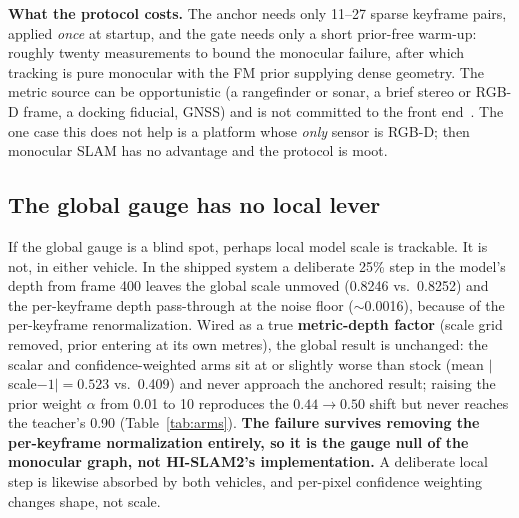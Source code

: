 \noindent\textbf{What the protocol costs.} The anchor needs only 11--27 sparse
keyframe pairs, applied \emph{once} at startup, and the gate needs only a short
prior-free warm-up: roughly twenty measurements to bound the monocular failure,
after which tracking is pure monocular with the FM prior supplying dense
geometry. The metric source can be opportunistic (a rangefinder or sonar, a
brief stereo or RGB-D frame, a docking fiducial, GNSS) and is not committed to
the front end~\cite{sinopoli2004,yang2022sonar,murartal2017,olson2011,wu2017vins}.
The one case this does not help is a platform whose \emph{only} sensor is RGB-D;
then monocular SLAM has no advantage and the protocol is moot.

\subsection{The global gauge has no local lever}
\label{sec:nolocal}

If the global gauge is a blind spot, perhaps local model scale is trackable. It
is not, in either vehicle. In the shipped system a deliberate 25\% step in the
model's depth from frame 400 leaves the global scale unmoved (0.8246 vs.\ 0.8252)
and the per-keyframe depth pass-through at the noise floor ($\sim$0.0016),
because of the per-keyframe renormalization. Wired as a true \textbf{metric-depth
factor} (scale grid removed, prior entering at its own metres), the global result
is unchanged: the scalar and confidence-weighted arms sit at or slightly worse
than stock (mean $|$scale$-1|=0.523$ vs.\ 0.409) and never approach the anchored
result; raising the prior weight $\alpha$ from 0.01 to 10 reproduces the
$0.44\to0.50$ shift but never reaches the teacher's 0.90 (Table~\ref{tab:arms}).
\textbf{The failure
survives removing the per-keyframe normalization entirely, so it is the gauge
null of the monocular graph, not HI-SLAM2's implementation.} A deliberate local
step is likewise absorbed by both vehicles, and per-pixel confidence weighting
changes shape, not scale.

